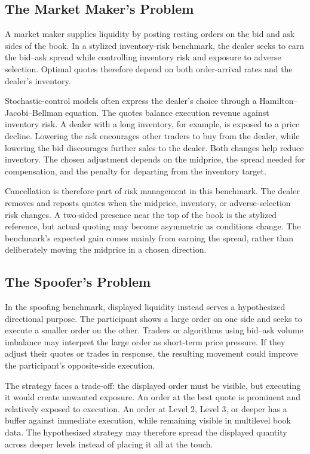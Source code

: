 \documentclass[11pt]{article}
\begin{document}
\subsection{The Market Maker's Problem}
\label{subsec:market_maker}
A market maker supplies liquidity by posting resting orders on the bid and ask sides of the book. In a stylized
inventory-risk benchmark, the dealer seeks to earn the bid--ask spread while controlling inventory risk and exposure to
adverse selection. Optimal quotes therefore depend on both order-arrival rates and the dealer's inventory.

Stochastic-control models often express the dealer's choice through a Hamilton--Jacobi--Bellman equation. The quotes balance execution revenue against inventory risk. A dealer with a long inventory, for example, is exposed to a price decline. Lowering the ask encourages other traders to buy from the dealer, while lowering the bid discourages further sales to the dealer. Both changes help reduce inventory. The chosen adjustment depends on the midprice, the spread needed for compensation, and the penalty for departing from the inventory target.

Cancellation is therefore part of risk management in this benchmark. The dealer removes and reposts quotes when the midprice, inventory, or adverse-selection risk changes. A two-sided presence near the top of the book is the stylized reference, but actual quoting may become asymmetric as conditions change. The benchmark's expected gain comes mainly from earning the spread, rather than deliberately moving the midprice in a chosen direction.

\subsection{The Spoofer's Problem}
\label{subsec:spoofing}
In the spoofing benchmark, displayed liquidity instead serves a hypothesized directional purpose. The participant shows a large order on one side and seeks to execute a smaller order on the other. Traders or algorithms using bid--ask volume imbalance may interpret the large order as short-term price pressure. If they adjust their quotes or trades in response, the resulting movement could improve the participant's opposite-side execution.

The strategy faces a trade-off: the displayed order must be visible, but executing it would create unwanted exposure. An order at the best quote is prominent and relatively exposed to execution. An order at Level 2, Level 3, or deeper has a buffer against immediate execution, while remaining visible in multilevel book data. The hypothesized strategy may therefore spread the displayed quantity across deeper levels instead of placing it all at the touch.
\end{document}
